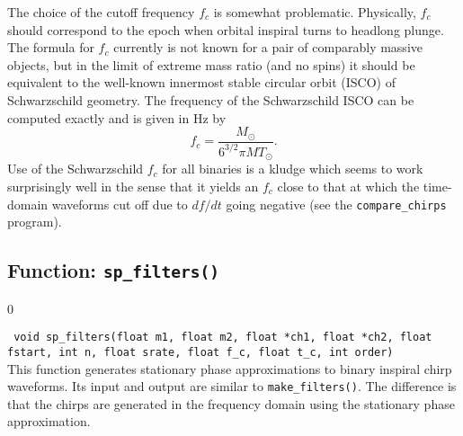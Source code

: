 The choice of the cutoff frequency $f_c$ is somewhat problematic.
Physically, $f_c$ should correspond to the epoch when orbital inspiral
turns to headlong plunge.  The formula for $f_c$ currently is not
known for a pair of comparably massive objects, but in the limit of
extreme mass ratio (and no spins) it should be equivalent to the
well-known innermost stable circular orbit (ISCO) of Schwarzschild
geometry.  The frequency of the Schwarzschild ISCO can be computed
exactly and is given in Hz by
\begin{equation}
f_c=\frac{M_\odot}{6^{3/2}\pi MT_\odot}.
\end{equation}
Use of the Schwarzschild $f_c$ for all binaries is a kludge which
seems to work surprisingly well in the sense that it yields an $f_c$
close to that at which the time-domain waveforms cut off due to
$df/dt$ going negative (see the {\tt compare\_chirps} program).

\clearpage

\subsection{Function: {\tt sp\_filters()}}
\label{ss:sp_filters}
\setcounter{equation}0

{\tt
void sp\_filters(float m1, float m2, float *ch1, float *ch2,
   float fstart, int n, float srate, float f\_c, float t\_c,
   int order)
}\\
This function generates stationary phase approximations to
binary inspiral chirp waveforms.
Its input and output are similar to {\tt make\_filters()}.
The difference is that the chirps are generated in the frequency domain
using the stationary phase approximation.

